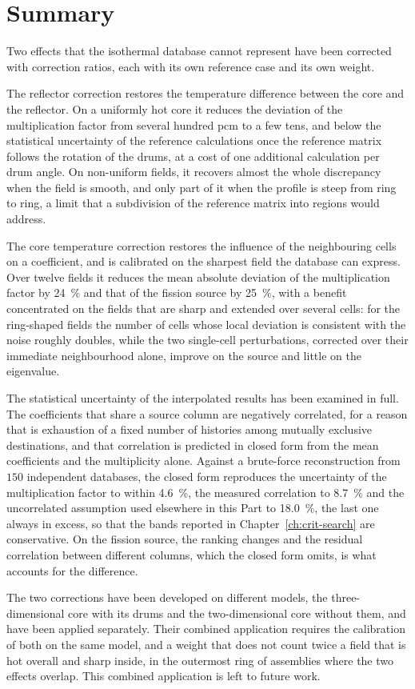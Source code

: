 \section{Summary}

Two effects that the isothermal database cannot represent have been corrected
with correction ratios, each with its own reference case and its own weight.

The reflector correction restores the temperature difference between the core
and the reflector. On a uniformly hot core it reduces the deviation of the
multiplication factor from several hundred pcm to a few tens, and below the
statistical uncertainty of the reference calculations once the reference matrix
follows the rotation of the drums, at a cost of one additional calculation per
drum angle. On non-uniform fields, it recovers almost the whole discrepancy when
the field is smooth, and only part of it when the profile is steep from ring to
ring, a limit that a subdivision of the reference matrix into regions would
address.

The core temperature correction restores the influence of the neighbouring
cells on a coefficient, and is calibrated on the sharpest field the database
can express. Over twelve fields it reduces the mean absolute deviation of the
multiplication factor by \SI{24}{\percent} and that of the fission source by
\SI{25}{\percent}, with a benefit concentrated on the fields that are sharp and
extended over several cells: for the ring-shaped fields the number of cells
whose local deviation is consistent with the noise roughly doubles, while the
two single-cell perturbations, corrected over their immediate neighbourhood
alone, improve on the source and little on the eigenvalue.

The statistical uncertainty of the interpolated results has been examined in
full. The coefficients that share a source column are negatively correlated,
for a reason that is exhaustion of a fixed number of histories among mutually
exclusive destinations, and that correlation is predicted in closed form from
the mean coefficients and the multiplicity alone. Against a brute-force
reconstruction from $150$ independent databases, the closed form reproduces the
uncertainty of the multiplication factor to within \SI{4.6}{\percent}, the
measured correlation to \SI{8.7}{\percent} and the uncorrelated assumption used
elsewhere in this Part to \SI{18.0}{\percent}, the last one always in excess,
so that the bands reported in Chapter~\ref{ch:crit-search} are conservative.
On the fission source, the ranking changes and the residual correlation
between different columns, which the closed form omits, is what accounts for
the difference.

The two corrections have been developed on different models, the
three-dimensional core with its drums and the two-dimensional core without
them, and have been applied separately. Their combined application requires
the calibration of both on the same model, and a weight that does not count
twice a field that is hot overall and sharp inside, in the outermost ring of
assemblies where the two effects overlap. This combined application is left to
future work.
